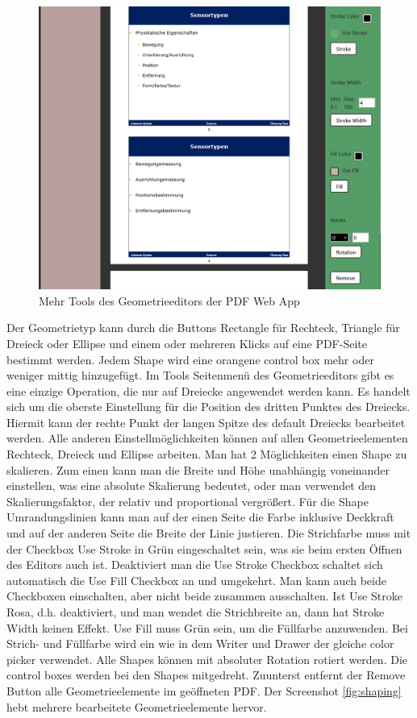 \begin{figure}[!htbp]
	\centering
	\includegraphics[width=1\textwidth]{"images/shaper2.png"}
	\caption{Mehr Tools des Geometrieeditors der PDF Web App}
	\label{fig:shaper2}
\end{figure}

Der Geometrietyp kann durch die Buttons Rectangle für Rechteck, Triangle für Dreieck oder Ellipse und einem oder mehreren Klicks auf eine PDF-Seite bestimmt werden. Jedem Shape wird eine orangene control box mehr oder weniger mittig hinzugefügt. Im Tools Seitenmenü des Geometrieeditors gibt es eine einzige Operation, die nur auf Dreiecke angewendet werden kann. Es handelt sich um die oberste Einstellung für die Position des dritten Punktes des Dreiecks. Hiermit kann der rechte Punkt der langen Spitze des default Dreiecks bearbeitet werden. Alle anderen Einstellmöglichkeiten können auf allen Geometrieelementen Rechteck, Dreieck und Ellipse arbeiten. Man hat 2 Möglichkeiten einen Shape zu skalieren. Zum einen kann man die Breite und Höhe unabhängig voneinander einstellen, was eine absolute Skalierung bedeutet, oder man verwendet den Skalierungsfaktor, der relativ und proportional vergrößert. Für die Shape Umrandungslinien kann man auf der einen Seite die Farbe inklusive Deckkraft und auf der anderen Seite die Breite der Linie justieren. Die Strichfarbe muss mit der Checkbox Use Stroke in Grün eingeschaltet sein, was sie beim ersten Öffnen des Editors auch ist. Deaktiviert man die Use Stroke Checkbox schaltet sich automatisch die Use Fill Checkbox an und umgekehrt. Man kann auch beide Checkboxen einschalten, aber nicht beide zusammen ausschalten. Ist Use Stroke Rosa, d.h. deaktiviert, und man wendet die Strichbreite an, dann hat Stroke Width keinen Effekt. Use Fill muss Grün sein, um die Füllfarbe anzuwenden. Bei Strich- und Füllfarbe wird ein wie in dem Writer und Drawer der gleiche color picker verwendet. Alle Shapes können mit absoluter Rotation rotiert werden. Die control boxes werden bei den Shapes mitgedreht. Zuunterst entfernt der Remove Button alle Geometrieelemente im geöffneten PDF. Der Screenshot \ref{fig:shaping} hebt mehrere bearbeitete Geometrieelemente hervor.

